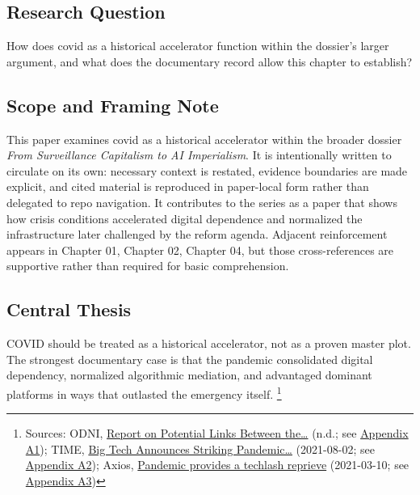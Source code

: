 \documentclass[
  american,
  11pt,
  letterpaper,
]{article}
\begin{document}
\subsection{Research Question}\label{research-question-3}

How does covid as a historical accelerator function within the dossier's
larger argument, and what does the documentary record allow this chapter
to establish?

\subsection{Scope and Framing Note}\label{scope-and-framing-note-3}

This paper examines covid as a historical accelerator within the broader
dossier \emph{From Surveillance Capitalism to AI Imperialism}. It is
intentionally written to circulate on its own: necessary context is
restated, evidence boundaries are made explicit, and cited material is
reproduced in paper-local form rather than delegated to repo navigation.
It contributes to the series as a paper that shows how crisis conditions
accelerated digital dependence and normalized the infrastructure later
challenged by the reform agenda. Adjacent reinforcement appears in
Chapter 01, Chapter 02, Chapter 04, but those cross-references are
supportive rather than required for basic comprehension.

\subsection{Central Thesis}\label{central-thesis-3}

COVID should be treated as a historical accelerator, not as a proven
master plot. The strongest documentary case is that the pandemic
consolidated digital dependency, normalized algorithmic mediation, and
advantaged dominant platforms in ways that outlasted the emergency
itself. \footnote{Sources: ODNI,
  \href{https://www.dni.gov/files/ODNI/documents/assessments/Report-on-Potential-Links-Between-the-Wuhan-Institute-of-Virology-and-the-Origins-of-COVID-19-20230623.pdf}{Report
  on Potential Links Between the\ldots{}} (n.d.; see
  \hyperref[ch-03-appendix-a1-report-on-potential-links-between-the-wuhan-institute-of-virology-and-the-origins-of-covid-19]{Appendix
  A1}); TIME,
  \href{https://time.com/6085674/big-tech-apple-microsoft-facebook-amazon-google-earnings/}{Big
  Tech Announces Striking Pandemic\ldots{}} (2021-08-02; see
  \hyperref[ch-03-appendix-a2-big-tech-announces-striking-pandemic-gains-as-small-businesses-strain-to-find-their-footing]{Appendix
  A2}); Axios,
  \href{https://www.axios.com/2021/03/10/pandemic-provides-techlash-reprieve}{Pandemic
  provides a techlash reprieve} (2021-03-10; see
  \hyperref[ch-03-appendix-a3-pandemic-provides-a-techlash-reprieve]{Appendix
  A3})}
\end{document}
